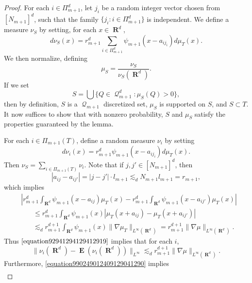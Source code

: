 \documentclass[12pt,reqno]{amsart}
\DeclareMathOperator{\RR}{\mathbf{R}}
\DeclareMathOperator{\EE}{\mathbf{E}}
\DeclareMathOperator{\DQ}{\mathcal{Q}}
\begin{document}
\begin{proof}
	For each $i \in \Pi_{m+1}^d$, let $j_i$ be a random integer vector chosen from $[N_{m+1}]^d$, such that the family $\{ j_i : i \in \Pi_{m+1}^d \}$ is independent. We define a measure $\nu_S$ by setting, for each $x \in \RR^d$,
	\[ d\nu_S(x) = r_{m+1}^d \sum_{i \in \Pi_{m+1}^d} \psi_{m+1}(x - a_{ij_i}) d\mu_T(x). \]
	We then normalize, defining
	\[ \mu_S = \frac{\nu_S}{\nu_S(\RR^d)}. \]
	If we set
	\[ S = \bigcup \{ Q \in \DQ_{m+1}^d : \mu_S(Q) > 0 \}, \]
	then by definition, $S$ is a $\DQ_{m+1}$ discretized set, $\mu_S$ is supported on $S$, and $S \subset T$. It now suffices to show that with nonzero probability, $S$ and $\mu_S$ satisfy the properties guaranteed by the lemma.

	For each $i \in \Pi_{m+1}(T)$, define a random measure $\nu_i$ by setting
	\[ d\nu_i(x) = r_{m+1}^d \psi_{m+1}(x - a_{ij_i}) d\mu_T(x). \]
	Then $\nu_S = \sum_{i \in \Pi_{m+1}(T)} \nu_i$. Note that if $j,j' \in [N_{m+1}]^d$, then
	\[ |a_{ij} - a_{ij'}| = |j - j'| \cdot l_{m+1} \lesssim_d N_{m+1} l_{m+1} = r_{m+1}, \]
	which implies
	\begin{equation} \label{equation92941294129412919}
	\begin{split}
		&\left| r_{m+1}^d \int_{\RR^d} \psi_{m+1}(x - a_{ij}) \mu_T(x) - r_{m+1}^d \int_{\RR^d} \psi_{m+1}(x - a_{ij'}) \mu_T(x) \right|\\
		&\ \ \ \ \ \ \ \ \leq r_{m+1}^d \int_{\RR^d} \psi_{m+1}(x) \left| \mu_T(x + a_{ij}) - \mu_T(x + a_{ij'}) \right|\\
		&\ \ \ \ \ \ \ \ \lesssim_d r_{m+1}^{d+1} \int_{\RR^d} \psi_{m+1}(x) \| \nabla \mu_T \|_{L^\infty(\RR^d)} = r_{m+1}^{d+1} \| \nabla \mu \|_{L^\infty(\RR^d)}.
	\end{split}
	\end{equation}
	Thus $\eqref{equation92941294129412919}$ implies that for each $i$,
	\begin{equation} \label{equation491040912491}
		\| \nu_i(\RR^d) - \EE(\nu_i(\RR^d)) \|_{L^\infty} \lesssim_d r_{m+1}^{d+1} \| \nabla \mu \|_{L^\infty(\RR^d)}.
	\end{equation}
	Furthermore, \eqref{equation990249012409129041290} implies
	\begin{equation} \label{9921490124912}
	\begin{split}

\end{split}
\end{equation}
\end{proof}
\end{document}
